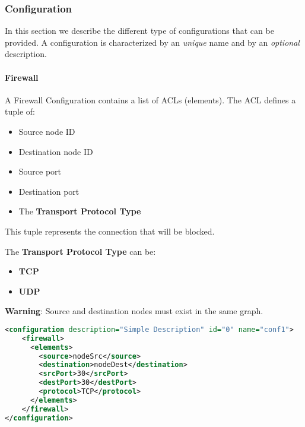 \subsubsection*{Configuration}
In this section we describe the different type of configurations that can be provided. A configuration is characterized by an \emph{unique} name and by an \emph{optional} description.

\paragraph{Firewall}
A Firewall Configuration contains a list of ACLs (elements). The ACL defines a tuple of:
\begin{itemize}
 \item Source node ID
 \item Destination node ID
 \item Source port
 \item Destination port
 \item The \textbf{Transport Protocol Type}
\end{itemize}
This tuple represents the connection that will be blocked.

The \textbf{Transport Protocol Type} can be:
\begin{itemize}
 \item \textbf{TCP}
 \item \textbf{UDP}
\end{itemize}

\begin{warning}
\textbf{Warning}: Source and destination nodes must exist in the same graph.
\end{warning}

\begin{lstlisting}[language=XML, caption=Firewall Configuration Example]
<configuration description="Simple Description" id="0" name="conf1">
    <firewall>
      <elements>
        <source>nodeSrc</source>
        <destination>nodeDest</destination>
        <srcPort>30</srcPort>
        <destPort>30</destPort>
        <protocol>TCP</protocol>
      </elements>
    </firewall>
</configuration>
\end{lstlisting}

